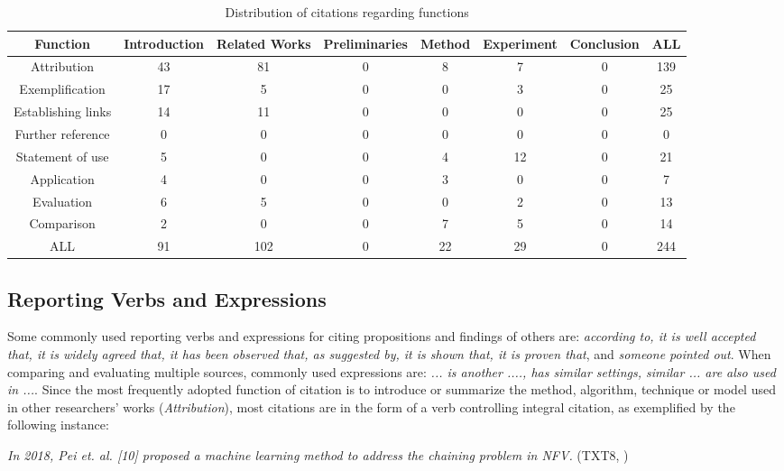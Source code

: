 \begin{table}[thb]
    \caption{Distribution of citations regarding functions}
    \centering
      \begin{tabulary}{\linewidth}{CCCCCCCC}
        \toprule[1.5pt]
        \textbf{Function} & \textbf{Introduction} & \textbf{Related Works} & \textbf{Preliminaries} & \textbf{Method} & \textbf{Experiment} & \textbf{Conclusion} & \textbf{ALL} \\
        \midrule[1pt]
        Attribution & 43 & 81 & 0 & 8 & 7 & 0 & 139\\
        Exemplification & 17 & 5 & 0 & 0 & 3 & 0 & 25\\
        Establishing links & 14 & 11 & 0 & 0 & 0 & 0 & 25\\
        Further reference & 0 & 0 & 0 & 0 & 0 & 0 & 0\\
        Statement of use & 5 & 0 & 0 & 4 & 12 & 0 & 21\\
        Application & 4 & 0 & 0 & 3 & 0 & 0 & 7\\
        Evaluation & 6 & 5 & 0 & 0 & 2 & 0 & 13\\
        Comparison & 2 & 0 & 0 & 7 & 5 & 0 & 14\\
        ALL & 91 & 102 & 0 & 22 & 29 & 0 & 244 \\
      \bottomrule[1.5pt]
    \end{tabulary}
    \label{tab:citation_function}
\end{table}

\subsection{Reporting Verbs and Expressions}
Some commonly used reporting verbs and expressions for citing propositions and findings of others are: \textit{according to, it is well accepted that, it is widely agreed that, it has been observed that, as suggested by, it is shown that, it is proven that}, and \textit{someone pointed out}. When comparing and evaluating multiple sources, commonly used expressions are: \textit{... is another ...., has similar settings, similar ... are also used in ...}. Since the most frequently adopted function of citation is to introduce or summarize the method, algorithm, technique or model used in other researchers’ works (\textit{Attribution}), most citations are in the form of a verb controlling integral citation, as exemplified by the following instance:

\textit{In 2018, Pei et. al. [10] proposed a machine learning method to address the chaining problem in NFV.} (TXT8, \citealp{yi_comprehensive_2018})


